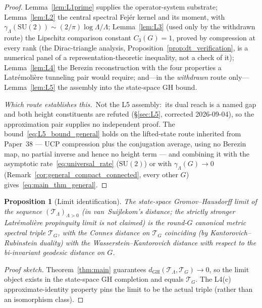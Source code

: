 \documentclass[11pt,a4paper]{article}
\theoremstyle{plain}
\newtheorem{proposition}[theorem]{Proposition}
\theoremstyle{definition}
\newcommand{\Lammax}{\Lambda}
\newcommand{\Tcal}{\mathcal{T}}
\newcommand{\SU}{\mathrm{SU}}
\begin{document}
\begin{proof}
Lemma~\ref{lem:L1prime} supplies the operator-system substrate;
Lemma~\ref{lem:L2} the central spectral Fej\'er kernel and its moment,
with $\gamma_\Lammax(\SU(2)) \sim (2/\pi) \log\Lammax/\Lammax$; Lemma~\ref{lem:L3} (used only
by the withdrawn route) the Lipschitz comparison constant $C_3(G) = 1$, proved by compression at
every rank (the Dirac-triangle analysis,
Proposition~\ref{prop:dt_verification}, is a numerical panel of a
representation-theoretic inequality, not a check of it); Lemma~\ref{lem:L4} the Berezin reconstruction with
the four properties a Latr\'emoli\`ere tunneling pair would require; and---in
the \emph{withdrawn} route only---Lemma~\ref{lem:L5} the assembly into the
state-space GH bound.

\emph{Which route establishes this.}\ Not the L5 assembly:\ its dual reach is a
named gap and both height constituents are refuted
(\S\ref{sec:L5}, corrected 2026-09-04), so the approximation pair supplies no
independent proof.  The bound~\eqref{eq:L5_bound_general} holds on the
lifted-state route inherited from Paper~38 --- UCP compression plus the
conjugation average, using no Berezin map, no partial inverse and hence no
height term --- and combining it with the asymptotic
rate~\eqref{eq:universal_rate} ($\SU(2)$) or with $\gamma_\Lammax(G) \to 0$
(Remark~\ref{cor:general_compact_connected}, every other $G$)
gives~\eqref{eq:main_thm_general}.
\end{proof}

\begin{proposition}[Limit identification]\label{prop:limit_id_general}
The state-space Gromov--Hausdorff limit of the sequence
$(\Tcal_\Lammax)_{\Lammax > 0}$ (in van~Suijlekom's distance; the
strictly stronger Latr\'emoli\`ere propinquity limit is not claimed) is
the round-$G$ canonical metric
spectral triple $\Tcal_G$, with the Connes distance on $\Tcal_G$
coinciding (by Kantorovich--Rubinstein duality) with the
Wasserstein--Kantorovich distance with respect to the bi-invariant
geodesic distance on $G$.
\end{proposition}

\begin{proof}[Proof sketch]
Theorem~\ref{thm:main} guarantees $d_{\mathrm{GH}}(\Tcal_\Lammax,
\Tcal_G) \to 0$, so the limit object exists in the state-space GH
completion and equals $\Tcal_G$. The L4(c) approximate-identity
property pins the limit to be the actual triple (rather than an
isomorphism class).
\end{proof}
\end{document}
